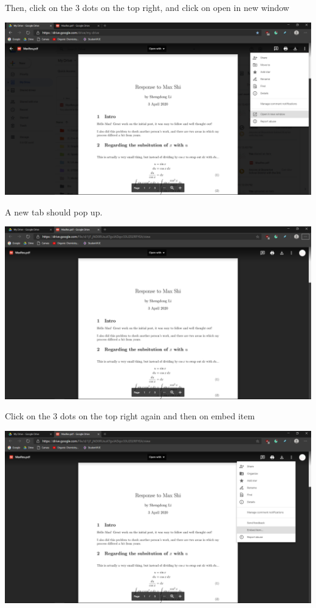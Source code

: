 \documentclass[letterpaper, 12pt]{article}
\begin{document}
Then, click on the 3 dots on the top right, and click on open in new window
\begin{center}
    \includegraphics[scale=0.3]{2.png}
\end{center}
A new tab should pop up.
\begin{center}
    \includegraphics[scale=0.3]{3.png}
\end{center}
Click on the 3 dots on the top right again and then on embed item
\begin{center}
    \includegraphics[scale=0.3]{4.png}
\end{center}
\end{document}
